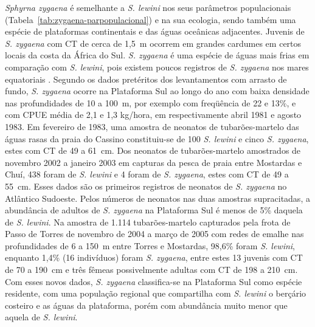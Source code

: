 \documentclass[a4paper,11pt,twoside,showtrims,onecolumn,openright,final]{memoir}
\begin{document}
\emph{Sphyrna zygaena} é semelhante a \emph{S. lewini} nos seus parâmetros populacionais (Tabela~\ref{tab:zygaena-parpopulacional}) 
e na sua ecologia, sendo também uma espécie de plataformas continentais e das águas oceânicas adjacentes. 
Juvenis de \emph{S. zygaena} com CT de cerca de 1,5~m ocorrem em grandes cardumes em certos locais da 
costa da África do Sul. \emph{S. zygaena} é uma espécie de águas mais frias em comparação com \emph{S. lewini}, 
pois existem poucos registros de \emph{S. zygaena} nos mares equatoriais \citep{COMPAGNO1984B}. %
Segundo os dados pretéritos dos levantamentos com arrasto de fundo, \emph{S. zygaena}  ocorre na 
Plataforma Sul ao longo do ano com baixa densidade nas profundidades de 10 a 100~m, 
por exemplo com freqüência de 22 e 13\%, e com CPUE média de 2,1 e 1,3 kg/hora, em 
respectivamente abril 1981 e agosto 1983. Em fevereiro de 1983, uma amostra de neonatos 
de tubarões-martelo das águas rasas da praia do Cassino constituiu-se de 100 \emph{S. lewini} e cinco \emph{S. zygaena}, 
estes com CT de 49 a 61~cm. Dos neonatos de tubarões-martelo amostrados de novembro 2002 a janeiro 2003 
em capturas da pesca de praia entre Mostardas e Chuí, 438 foram de \emph{S. lewini} e 4 foram de \emph{S. zygaena}, 
estes com CT de 49 a 55~cm. Esses dados são os primeiros registros de neonatos de \emph{S. zygaena} 
no Atlântico Sudoeste. Pelos números de neonatos nas duas amostras supracitadas, a abundância 
de adultos de \emph{S. zygaena} na Plataforma Sul é menos de 5\% daquela de \emph{S. lewini}.
Na amostra de 1.114 tubarões-martelo capturados pela frota de Passo de Torres de novembro de 2004 
a março de 2005 com redes de emalhe nas profundidades de 6 a 150~m entre Torres 
e Mostardas, 98,6\% foram \emph{S. lewini}, enquanto 1,4\% (16 indivíduos) foram \emph{S. zygaena}, 
entre estes 13 juvenis com CT de   70 a 190~cm e três fêmeas possivelmente adultas 
com CT de  198 a 210~cm. Com esses novos dados, \emph{S. zygaena} classifica-se na Plataforma Sul 
como espécie residente, com uma população regional  que compartilha com \emph{S. lewini}  
o berçário costeiro e as águas da plataforma, porém com abundância muito menor 
que aquela de \emph{S. lewini}. 

%
%
\end{document}
